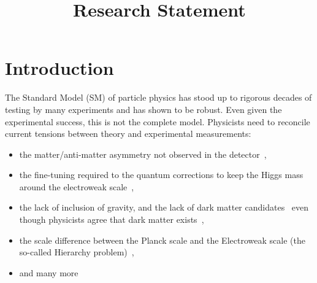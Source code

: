 \documentclass[10pt,a4paper,sans]{moderncv/moderncv} %
\title{Research Statement}
\begin{document}
\renewcommand*{\bibliographyhead}[1]{\section{#1}}
\makecvtitle %
\vspace*{-4em}

\section{Introduction}

The Standard Model (SM) of particle physics has stood up to rigorous decades of testing by many experiments and has shown to be robust. Even given the experimental success, this is not the complete model. Physicists need to reconcile current tensions between theory and experimental measurements:
\\
\begin{itemize}
 \item the matter/anti-matter asymmetry not observed in the detector~\cite{canetti2012matter},
 \item the fine-tuning required to the quantum corrections to keep the Higgs mass around the electroweak scale~\cite{Baer:2013ava},
 \item the lack of inclusion of gravity, and the lack of dark matter candidates~\cite{bertone2005particle} even though physicists agree that dark matter exists~\cite{Ade:2015xua},
 \item the scale difference between the Planck scale and the Electroweak scale (the so-called Hierarchy problem)~\cite{tHooft:1980xss},
 \item and many more\\%
\end{itemize}
\end{document}
